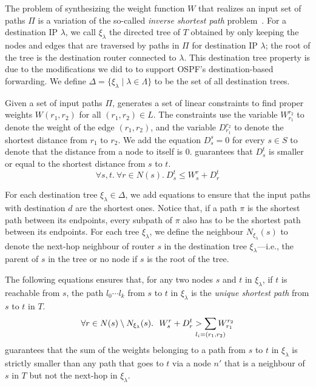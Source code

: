 The problem of synthesizing the weight function $W$ that
realizes an input set of paths $\Pi$ is
a
variation of the so-called {\em inverse shortest path} 
problem~\cite{isp}. 
For a destination IP $\lambda$, we call $\xi_\lambda$ 
the directed tree of $T$ 
obtained by only keeping the nodes and edges 
that are traversed by paths in $\Pi$ for 
destination IP $\lambda$; the root of the tree
is the destination router connected to $\lambda$. 
 This destination tree
 property is due to the modifications we did to \genesis
 to support OSPF's destination-based forwarding. We
 define $\Delta=\{\xi_\lambda\mid \lambda \in \Lambda\}$ to be 
the set of all destination trees. 

Given a set of input paths $\Pi$, \name 
generates a set of linear constraints to 
find proper weights $W(r_1,r_2)$ 
for all $(r_1, r_2) \in L$.
The constraints use the variable $W_{r_1}^{r_2}$
to denote the weight of the edge $(r_1, r_2)$, and the variable
$D_{r_1}^{r_2}$ to denote the 
shortest distance from $r_1$ to $r_2$.
We add the equation $D_{s}^{s} = 0$ 
for every $s\in S$ to denote that the distance
from a node to itself is $0$.
 guarantees that $D_{s}^{t}$ is smaller or equal to
the shortest distance from $s$ to $t$.
\begin{equation} \label{eq:dist}
\forall s, t. ~\forall r \in N(s).~
D_s^t \leq W_s^r + D_r^t
\end{equation}

For each destination tree $\xi_\lambda\in\Delta$, we add equations to ensure 
that the input paths with destination $d$ are the shortest ones.
Notice that, if a path $\pi$
is the shortest path between its endpoints, every 
subpath of $\pi$ also has to be the shortest path between its endpoints.
For each tree $\xi_\lambda$, we define the neighbour
 $N_{\xi_\lambda}(s)$ to denote the 
next-hop neighbour of router $s$ in the destination tree $\xi_\lambda$---i.e., the parent
of $s$ in the tree or no node if $s$ is the root of the tree.

The following equations ensures that, for any 
 two nodes $s$ and $t$ in
$\xi_\lambda$, if $t$ is reachable from $s$, 
the path $l_0\cdots l_k$ from $s$ to $t$ in $\xi_\lambda$ is the 
\emph{unique shortest path} from $s$ to $t$ in $T$.
\begin{multline} \label{eq:uniq1}
\forall r \in N(s) \setminus N_{\xi_\lambda}(s).~~
W_{s}^{r}+ D_{r}^{t} > \sum_{\mathclap{\substack{l_i=(r_1,r_2)}}} 
W_{r_1}^{r_2}
\end{multline}
 guarantees that 
the sum of the weights belonging to a path from $s$ to $t$ in $\xi_\lambda$ 
is strictly smaller than 
any path that goes to $t$ via 
a node $n'$ that is a neighbour of $s$ in $T$ but not 
the next-hop in $\xi_\lambda$.

